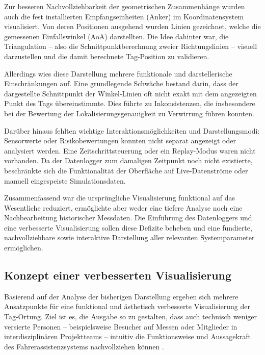 \documentclass[a4paper, 12pt]{article} %
\begin{document}
Zur besseren Nachvollziehbarkeit der geometrischen Zusammenhänge wurden auch die fest installierten Empfangseinheiten (Anker) im Koordinatensystem 
visualisiert. Von deren Positionen ausgehend wurden Linien gezeichnet, welche die gemessenen Einfallswinkel (\ac{AoA}) darstellten. Die 
Idee dahinter war, die Triangulation – also die Schnittpunktberechnung zweier Richtungslinien – visuell darzustellen und die damit berechnete Tag-Position
zu validieren.

Allerdings wies diese Darstellung mehrere funktionale und darstellerische Einschränkungen auf. Eine grundlegende Schwäche bestand darin, dass der 
dargestellte Schnittpunkt der Winkel-Linien oft nicht exakt mit dem angezeigten Punkt des Tags übereinstimmte. Dies führte zu Inkonsistenzen, die 
insbesondere bei der Bewertung der Lokalisierungsgenauigkeit zu Verwirrung führen konnten.

Darüber hinaus fehlten wichtige Interaktionsmöglichkeiten und Darstellungsmodi: Sensorwerte oder Risikobewertungen konnten 
nicht separat angezeigt oder analysiert werden. Eine Zeitschrittsteuerung oder ein Replay-Modus waren nicht vorhanden. Da der 
Datenlogger zum damaligen Zeitpunkt noch nicht existierte, beschränkte sich die Funktionalität der Oberfläche auf Live-Datenströme oder manuell 
eingespeiste Simulationsdaten.

Zusammenfassend war die ursprüngliche Visualisierung funktional auf das Wesentliche reduziert, ermöglichte aber weder eine tiefere Analyse noch eine 
Nachbearbeitung historischer Messdaten. Die Einführung des Datenloggers \cite{json_processing_books} und eine verbesserte Visualisierung sollen diese Defizite beheben und eine 
fundierte, nachvollziehbare sowie interaktive Darstellung aller relevanten Systemparameter ermöglichen.

\subsection{Konzept einer verbesserten Visualisierung}

Basierend auf der Analyse der bisherigen Darstellung ergeben sich mehrere Ansatzpunkte für eine funktional und ästhetisch verbesserte Visualisierung
der Tag-Ortung. Ziel ist es, die Ausgabe so zu gestalten, dass auch technisch weniger versierte Personen – beispielsweise Besucher auf Messen oder 
Mitglieder in interdisziplinären Projektteams – intuitiv die Funktionsweise und Aussagekraft des Fahrerassistenzsystems nachvollziehen können \cite{human_factors_vis}.
\end{document}
